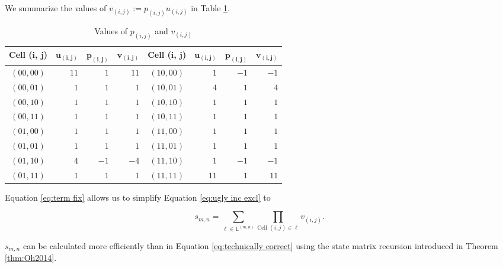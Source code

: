 \documentclass[12pt]{article}
\theoremstyle{plain}
\theoremstyle{definition}
\theoremstyle{remark}
\theoremstyle{definition}
\begin{document}
We summarize the values of $v_{(i,j)} := p_{(i,j)}u_{(i,j)}$ in Table \ref{tbl:values of p and v}.

\begin{table}[h!]
    \begin{center}
        \begin{tabular}{ |c|r|r|r|c|r|r|r| } 
            \hline
            \textbf{Cell (}$\mathbf{i}$\textbf{,} $\mathbf{j}$\textbf{)} & $\mathbf{u_{(i,j)}}$ & $\mathbf{p_{(i,j)}}$ & $\mathbf{v_{(i,j)}}$ & \textbf{Cell (}$\mathbf{i}$\textbf{,} $\mathbf{j}$\textbf{)} & $\mathbf{u_{(i,j)}}$ & $\mathbf{p_{(i,j)}}$ & $\mathbf{v_{(i,j)}}$ \\ 
            \hline
            $(00, 00)$ & $11$ & $1$ & $11$ & $(10, 00)$ & $1$ & $-1$ & $-1$ \\
            \hline
            $(00, 01)$ & $1$ & $1$ & $1$ & $(10, 01)$ & $4$ & $1$ & $4$ \\
            \hline
            $(00, 10)$ & $1$ & $1$ & $1$ & $(10, 10)$ & $1$ & $1$ & $1$ \\
            \hline
            $(00, 11)$ & $1$ & $1$ & $1$ & $(10, 11)$ & $1$ & $1$ & $1$ \\
            \hline
            $(01, 00)$ & $1$ & $1$ & $1$ & $(11, 00)$ & $1$ & $1$ & $1$ \\
            \hline
            $(01, 01)$ & $1$ & $1$ & $1$ & $(11, 01)$ & $1$ & $1$ & $1$ \\
            \hline
            $(01, 10)$ & $4$ & $-1$ & $-4$ & $(11, 10)$ & $1$ & $-1$ & $-1$ \\
            \hline
            $(01, 11)$ & $1$ & $1$ & $1$ & $(11, 11)$ & $11$ & $1$ & $11$ \\
            \hline
        \end{tabular}
        \caption{Values of $p_{(i,j)}$ and $v_{(i,j)}$}
        \label{tbl:values of p and v}
    \end{center}
\end{table}

Equation \ref{eq:term fix} allows us to simplify Equation \ref{eq:ugly inc excl} to

\begin{equation}
    s_{m,n} = \sum_{\ell \in \mathbb{L}^{(m,n)}} \prod_{\text{Cell }(i,j) \in \ell} v_{(i,j)}.
\label{eq:technically correct}
\end{equation}

$s_{m,n}$ can be calculated more efficiently than in Equation \ref{eq:technically correct} using the state matrix recursion introduced in Theorem \ref{thm:Oh2014}.
\end{document}
